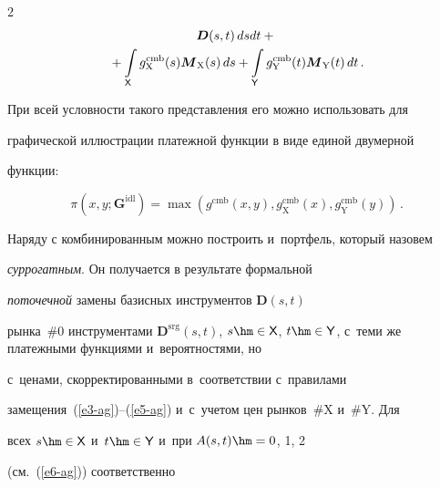 \begin{multicols}{2}
\begin{multline}
\boldsymbol{D}(s,t)\,dsdt+{}\\


{}+\int\limits_{\sf X} 


g^{\mathrm{cmb}}_{\mathrm{X}}(s)\boldsymbol{M}_{\mathrm{X}}(s)\,ds+


  \int\limits_{\sf Y} 


g^{\mathrm{cmb}}_{\mathrm{Y}}(t)\boldsymbol{M}_{\mathrm{Y}}(t)\,dt\,.


  \label{e15-ag}


  \end{multline}


  


  При всей условности такого представления его можно использовать для 


графической иллюстрации платежной функции в виде единой двумерной 


функции:


  \begin{equation*}


  \pi\left( x,y;\boldsymbol{G}^{\mathrm{idl}}\right)= \max \left( g^{\mathrm{cmb}}(x,y), 


g^{\mathrm{cmb}}_{\mathrm{X}}(x), g^{\mathrm{cmb}}_{\mathrm{Y}}(y)\right)\,.




  \end{equation*}


  


  Наряду с комбинированным можно построить и~портфель, который назовем 


\textit{суррогатным}. Он получается в результате формальной 


\textit{поточечной} замены базисных инструментов $\boldsymbol{D}(s,t)$ 


рынка~\#0 инструментами $\boldsymbol{D}^{\mathrm{srg}}(s, t)$, $s \hm\in {\sf X}$, $t 


\hm\in {\sf Y}$, с~теми же платежными функциями и~вероятностями, но 


с~ценами, скорректированными в~соответствии с~правилами 


замещения~(\ref{e3-ag})--(\ref{e5-ag}) и~с~учетом цен рынков~\#X и~\#Y. Для 


всех $s\hm\in {\sf X}$ и~$t\hm\in {\sf Y}$ и~при $A(s, t)\hm = 0$, 1, 2 


(см.~(\ref{e6-ag})) соответственно 


  $$



\end{multicols}
